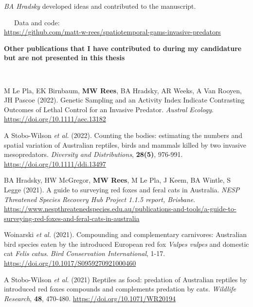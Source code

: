 \documentclass[11pt,a4paper,titlepage,twoside,openright]{style/unimelbthesis}
\begin{document}
\begin{frontmatter}
\begin{preface}
    \hspace*{0.333em}\hspace*{0.333em}\hspace*{0.333em}\hspace*{0.333em}\hspace*{0.333em}\hspace*{0.333em}\hspace*{0.333em}\hspace*{0.333em}\emph{BA Hradsky} developed ideas and contributed to the manuscript.

    ~~~Data and code:\\
    \url{https://github.com/matt-w-rees/spatiotemporal-gams-invasive-predators}

    \newpage

    \textbf{Other publications that I have contributed to during my candidature but are not presented in this thesis}

    \(~\)

    M Le Pla, EK Birnbaum, \textbf{MW Rees}, BA Hradsky, AR Weeks, A Van Rooyen, JH Pascoe (2022). Genetic Sampling and an Activity Index Indicate Contrasting Outcomes of Lethal Control for an Invasive Predator. \emph{Austral Ecology}. \url{https://doi.org/10.1111/aec.13182}

    A Stobo-Wilson \emph{et al.} (2022). Counting the bodies: estimating the numbers and spatial variation of Australian reptiles, birds and mammals killed by two invasive mesopredators. \emph{Diversity and Distributions}, \textbf{28(5)}, 976-991. \url{https://doi.org/10.1111/ddi.13497}

    BA Hradsky, HW McGregor, \textbf{MW Rees}, M Le Pla, J Keem, BA Wintle, S Legge (2021). A guide to surveying red foxes and feral cats in Australia. \emph{NESP Threatened Species Recovery Hub Project 1.1.5 report, Brisbane}.
    \url{https://www.nespthreatenedspecies.edu.au/publications-and-tools/a-guide-to-surveying-red-foxes-and-feral-cats-in-australia}

    Woinarski \emph{et al.} (2021). Compounding and complementary carnivores: Australian bird species eaten by the introduced European red fox \emph{Vulpes vulpes} and domestic cat \emph{Felis catus}. \emph{Bird Conservation International}, 1-17. \url{https://doi.org/10.1017/S0959270921000460}

    A Stobo-Wilson \emph{et al.} (2021) Reptiles as food: predation of Australian reptiles by introduced red foxes compounds and complements predation by cats. \emph{Wildlife Research}, \textbf{48}, 470-480. \url{https://doi.org/10.1071/WR20194}


\end{preface}
\end{frontmatter}
\end{document}
